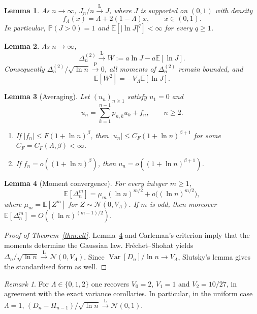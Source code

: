 \documentclass[11pt]{article}
\newtheorem{lemma}{Lemma}
\theoremstyle{remark}
\newtheorem{remark}{Remark}
\newcommand{\E}{\mathbb{E}}
\newcommand{\Pbb}{\mathbb{P}}
\newcommand{\Var}{\operatorname{Var}}
\newcommand{\llaw}{\xrightarrow{\mathrm{L}}}
\newcommand{\plaw}{\xrightarrow{\mathrm{P}}}
\begin{document}
\begin{lemma}
\label{lem:parent}
As \(n\to\infty\), \(J_n/n\llaw J\), where \(J\) is supported on \((0,1)\) with
density
\begin{equation}
f_\Lambda(x)=\Lambda+2(1-\Lambda)x,\qquad x\in(0,1).
\label{eq:parent-dens}
\end{equation}
In particular, \(\Pbb(J>0)=1\) and \(\E[|\ln J|^q]<\infty\) for every \(q\ge 1\).
\end{lemma}

\begin{lemma}
\label{lem:W}
As \(n\to\infty\),
\[
\Delta_n^{(2)}\llaw W:=a\ln J-a\E[\ln J].
\]
Consequently \(\Delta_n^{(2)}/\sqrt{\ln n}\plaw 0\), all moments of
\(\Delta_n^{(2)}\) remain bounded, and
\[
\E[W^2]=-V_\Lambda\E[\ln J].
\]
\end{lemma}

\begin{lemma}[Averaging]
\label{lem:avg}
Let \((u_n)_{n\ge 1}\) satisfy \(u_1=0\) and
\[
u_n=\sum_{k=1}^{n-1}p_{n,k}u_k+f_n,\qquad n\ge 2.
\]
\begin{enumerate}
\item If \(|f_n|\le F(1+\ln n)^\beta\), then
\(|u_n|\le C_F(1+\ln n)^{\beta+1}\) for some \(C_F=C_F(\Lambda,\beta)<\infty\).
\item If \(f_n=o((1+\ln n)^\beta)\), then \(u_n=o((1+\ln n)^{\beta+1})\).
\end{enumerate}
\end{lemma}

\begin{lemma}[Moment convergence]
\label{lem:moments}
For every integer \(m\ge 1\),
\[
\E[\Delta_n^m]=\mu_m(\ln n)^{m/2}+o\bigl((\ln n)^{m/2}\bigr),
\]
where \(\mu_m=\E[Z^m]\) for \(Z\sim\mathcal{N}(0,V_\Lambda)\). If \(m\) is odd,
then moreover \(\E[\Delta_n^m]=O((\ln n)^{(m-1)/2})\).
\end{lemma}

\begin{proof}[Proof of Theorem~\ref{thm:clt}]
Lemma~\ref{lem:moments} and Carleman's criterion imply that the moments determine
the Gaussian law. Fr\'echet--Shohat yields
\(\Delta_n/\sqrt{\ln n}\llaw\mathcal{N}(0,V_\Lambda)\). Since
\(\Var[D_n]/\ln n\to V_\Lambda\), Slutsky's lemma gives the standardised form as
well.
\end{proof}

\begin{remark}
For \(\Lambda\in\{0,1,2\}\) one recovers \(V_0=2\), \(V_1=1\) and
\(V_2=10/27\), in agreement with the exact variance corollaries. In particular,
in the uniform case \(\Lambda=1\),
\((D_n-H_{n-1})/\sqrt{\ln n}\llaw\mathcal{N}(0,1)\).
\end{remark}
\end{document}
